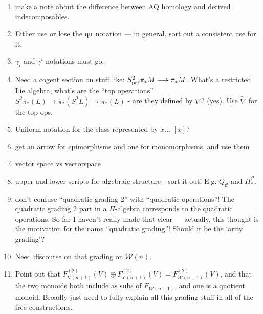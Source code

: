 \documentclass[11pt]{amsart}
\theoremstyle{plain}
\theoremstyle{definition}
\renewcommand{\to}{\longrightarrow}
\newcommand{\calW}{\mathcal{W}}
\newcommand{\calU}{\mathcal{U}}
\newcommand{\calL}{\mathcal{L}}
\newcommand{\calC}{\mathcal{C}}
\theoremstyle{plain}
\newcommand{\quadratic}{\textup{qu}}
\begin{document}
\begin{enumerate}
\item make a note about the difference between AQ homology and derived indecomposables.
\item Either use or lose the $\quadratic$ notation --- in general, sort out a consistent use for it.
\item $\gamma_i$ and $\gamma^i$ notations must go.
\item Need a cogent section on stuff like: $S^2_\textup{pr?}\pi_*M\to \pi_*M$. What's a restricted Lie algebra, what's are the ``top operations'' $S^2\pi_*(L)\to \pi_*(S^2L)\to \pi_*(L)$ - are they defined by $\nabla$? (yes). Use $\widetilde{\nabla}$ for the top ops.
\item Uniform notation for the class represented by $x$... $[x]$?
\item get an arrow for epimorphisms and one for monomorphisms, and use them
\item vector space vs vectorspace
\item upper and lower scripts for algebraic structure - sort it out! E.g. $Q_\calC$ and $H_*^\calC$.
\item don't confuse ``quadratic grading 2'' with ``quadratic operations''! The quadratic grading 2 part in a $\Pi$-algebra corresponds to the quadratic operations. So far I haven't really made that clear --- actually, this thought is the motivation for the name ``quadratic grading''! Should it be the `arity grading'?
\item Need discourse on that grading on $\calW(n)$.
\item Point out that $F_{\calU(n+1)}^{(2)}(V)\oplus F_{\calL(n+1)}^{(2)}(V)=F_{\calW(n+1)}^{(2)}(V)$, and that the two monoids both include as subs of $F_{\calW(n+1)}$, and one is a quotient monoid. Broadly just need to fully explain all this grading stuff in all of the free constructions.
\end{enumerate}
\end{document}
